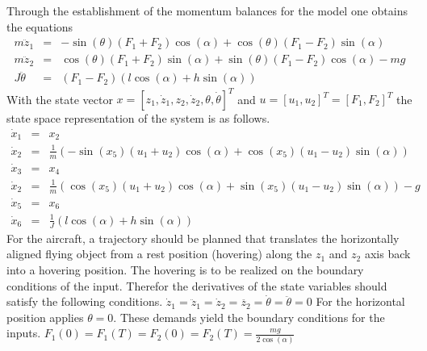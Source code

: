 \documentclass[letterpaper,10pt,english]{sphinxmanual}
\begin{document}
Through the establishment of the momentum balances for the model one
obtains the equations
\begin{eqnarray*}
   m \ddot{z}_1 & = & - \sin(\theta)(F_1 + F_2)\cos(\alpha) + \cos(\theta)(F_1 - F_2)\sin(\alpha) \\
   m \ddot{z}_2 & = & \cos(\theta)(F_1 + F_2)\sin(\alpha) + \sin(\theta)(F_1 - F_2)\cos(\alpha) - mg \\
   J \ddot{\theta} & = & (F_1 - F_2)(l \cos(\alpha) + h \sin(\alpha))
\end{eqnarray*}
With the state vector \(x = [z_1, \dot{z}_1, z_2, \dot{z}_2, \theta, \dot{\theta}]^T\)
and \(u = [u_1, u_2]^T = [F_1, F_2]^T\) the state space
representation of the system is as follows.
\begin{eqnarray*}
   \dot{x}_1 & = & x_2 \\
   \dot{x}_2 & = & \frac{1}{m}(-\sin(x_5)(u_1 + u_2)\cos(\alpha) + \cos(x_5)(u_1 - u_2)\sin(\alpha)) \\
   \dot{x}_3 & = & x_4 \\
   \dot{x}_2 & = & \frac{1}{m}(\cos(x_5)(u_1 + u_2)\cos(\alpha) + \sin(x_5)(u_1 - u_2)\sin(\alpha)) - g  \\
   \dot{x}_5 & = & x_6 \\
   \dot{x}_6 & = & \frac{1}{J}(l \cos(\alpha) + h \sin(\alpha))
\end{eqnarray*}
For the aircraft, a trajectory should be planned that translates the
horizontally aligned flying object from a rest position (hovering) along
the \(z_1\) and \(z_2\) axis back into a hovering position.
The hovering is to be realized on the boundary conditions of the input.
Therefor the derivatives of the state variables should satisfy the
following conditions.
$ \dot{z}_1 = \ddot{z}_1 = \dot{z}_2 = \ddot{z_2} = \dot{\theta} = \ddot{\theta} = 0 $
For the horizontal position applies \(\theta = 0\). These demands
yield the boundary conditions for the inputs.
$ F_1(0) = F_1(T) = F_2(0) = F_2(T) = \frac{mg}{2 \cos(\alpha)} $
\end{document}
